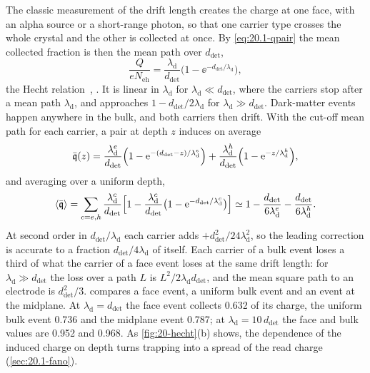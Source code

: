 The classic measurement of the drift length creates the charge at one face, with an alpha source or a short-range photon, so that one carrier type crosses the whole crystal and the other is collected at once. By \cref{eq:20.1-qpair} the mean collected fraction is then the mean path over $d_{\mathrm{det}}$,
\begin{equation}
  \frac{Q}{eN_{\mathrm{eh}}} = \frac{\lambda_{\mathrm{d}}}{d_{\mathrm{det}}}\bigl(1 - \ee^{-d_{\mathrm{det}}/\lambda_{\mathrm{d}}}\bigr) ,
  \label{eq:20.1-hecht}
\end{equation}
the Hecht relation~\cite{hecht1932mechanismus}, \cite[Eqs.~(1)--(4)]{lachish2017electron}. It is linear in $\lambda_{\mathrm{d}}$ for $\lambda_{\mathrm{d}} \ll d_{\mathrm{det}}$, where the carriers stop after a mean path $\lambda_{\mathrm{d}}$, and approaches $1 - d_{\mathrm{det}}/2\lambda_{\mathrm{d}}$ for $\lambda_{\mathrm{d}} \gg d_{\mathrm{det}}$. Dark-matter events happen anywhere in the bulk, and both carriers then drift. With the cut-off mean path for each carrier, a pair at depth $z$ induces on average
\begin{equation}
  \bar{\mathfrak{q}}(z) = \frac{\lambda_{\mathrm{d}}^e}{d_{\mathrm{det}}}\Bigl(1 - \mathrm{e}^{-(d_{\mathrm{det}} - z)/\lambda_{\mathrm{d}}^e}\Bigr) + \frac{\lambda_{\mathrm{d}}^h}{d_{\mathrm{det}}}\Bigl(1 - \mathrm{e}^{-z/\lambda_{\mathrm{d}}^h}\Bigr) ,
  \label{eq:20.1-hecht2}
\end{equation}
and averaging over a uniform depth,
\begin{equation}
  \langle\bar{\mathfrak{q}}\rangle = \sum_{c = e, h}\frac{\lambda_{\mathrm{d}}^c}{d_{\mathrm{det}}}\Bigl[1 - \frac{\lambda_{\mathrm{d}}^c}{d_{\mathrm{det}}}\bigl(1 - \mathrm{e}^{-d_{\mathrm{det}}/\lambda_{\mathrm{d}}^c}\bigr)\Bigr] \simeq 1 - \frac{d_{\mathrm{det}}}{6\lambda_{\mathrm{d}}^e} - \frac{d_{\mathrm{det}}}{6\lambda_{\mathrm{d}}^h} .
  \label{eq:20.1-qavg}
\end{equation}
At second order in $d_{\mathrm{det}}/\lambda_{\mathrm{d}}$ each carrier adds $+d_{\mathrm{det}}^2/24\lambda_{\mathrm{d}}^2$, so the leading correction is accurate to a fraction $d_{\mathrm{det}}/4\lambda_{\mathrm{d}}$ of itself. Each carrier of a bulk event loses a third of what the carrier of a face event loses at the same drift length: for $\lambda_{\mathrm{d}} \gg d_{\mathrm{det}}$ the loss over a path $L$ is $L^2/2\lambda_{\mathrm{d}}d_{\mathrm{det}}$, and the mean square path to an electrode is $d_{\mathrm{det}}^2/3$.  compares a face event, a uniform bulk event and an event at the midplane. At $\lambda_{\mathrm{d}} = d_{\mathrm{det}}$ the face event collects 0.632 of its charge, the uniform bulk event 0.736 and the midplane event 0.787; at $\lambda_{\mathrm{d}} = 10\,d_{\mathrm{det}}$ the face and bulk values are 0.952 and 0.968. As \cref{fig:20-hecht}(b) shows, the dependence of the induced charge on depth turns trapping into a spread of the read charge (\cref{sec:20.1-fano}).

